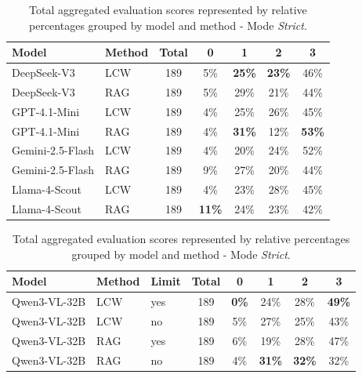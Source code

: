 \begin{table}[H]
    \centering
    \caption[Correctness - Answered - Percentage Rates - \textit{Strict} Mode]{Total aggregated evaluation scores represented by relative percentages grouped by model and method - Mode \textit{Strict}.}
    \label{tab:total_strict_rates_answered}
    
    \begin{threeparttable}
        \small 
        \setlength{\tabcolsep}{8pt}
        \begin{tabular}{llccccc}
            \toprule
            \textbf{Model} & \textbf{Method} & \textbf{Total} & \textbf{0} & \textbf{1} & \textbf{2} & \textbf{3} \\
            \midrule
            DeepSeek-V3 & LCW & 189 & 5\% & \textbf{25\%} & \textbf{23\%} & 46\% \\
            \rowcolor{gray!10} DeepSeek-V3 & RAG & 189 & 5\% & 29\% & 21\% & 44\% \\
            \addlinespace
            GPT-4.1-Mini & LCW & 189 & 4\% & 25\% & 26\% & 45\% \\
            \rowcolor{gray!10} GPT-4.1-Mini & RAG & 189 & 4\% & \textbf{31\%} & 12\% & \textbf{53\%} \\
            \addlinespace
            Gemini-2.5-Flash & LCW & 189 & 4\% & 20\% & 24\% & 52\% \\
            \rowcolor{gray!10} Gemini-2.5-Flash & RAG & 189 & 9\% & 27\% & 20\% & 44\% \\
            \addlinespace
            Llama-4-Scout & LCW & 189 & 4\% & 23\% & 28\% & 45\% \\
            \rowcolor{gray!10} Llama-4-Scout & RAG & 189 & \textbf{11\%} & 24\% & 23\% & 42\% \\
            \bottomrule
        \end{tabular}
    \end{threeparttable}
    
    \vspace{1.5em}
    
    \begin{threeparttable}
        \small
        \setlength{\tabcolsep}{6pt}
        \begin{tabular}{lllccccc}
            \toprule
            \textbf{Model} & \textbf{Method} & \textbf{Limit} & \textbf{Total} & \textbf{0} & \textbf{1} & \textbf{2} & \textbf{3} \\
            \midrule
            Qwen3-VL-32B & LCW & yes & 189 & \textbf{0\%} & 24\% & 28\% & \textbf{49\%} \\
            Qwen3-VL-32B & LCW & no & 189 & 5\% & 27\% & 25\% & 43\% \\
            \rowcolor{gray!10} Qwen3-VL-32B & RAG & yes & 189 & 6\% & 19\% & 28\% & 47\% \\
            \rowcolor{gray!10} Qwen3-VL-32B & RAG & no & 189 & 4\% & \textbf{31\%} & \textbf{32\%} & 32\% \\
            \bottomrule
        \end{tabular}
        

\end{threeparttable}
\end{table}
